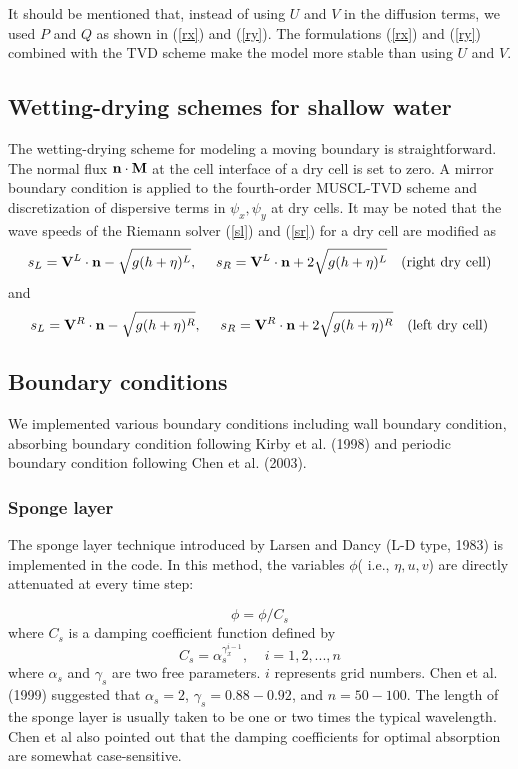 \documentclass[11pt]{article}
\newcommand{\be}{\begin{equation}}
\newcommand{\ee}{\end{equation}}
\begin{document}
It should be mentioned that, instead of using $U$ and $V$ in the diffusion terms, we used $P$ and $Q$ as shown in (\ref{rx}) and (\ref{ry}).   The formulations  (\ref{rx}) and (\ref{ry}) combined with the TVD scheme make the model more stable than  using $U$ and $V$. 

\subsection{Wetting-drying schemes for shallow water}

The wetting-drying scheme for modeling  a moving boundary is straightforward. The normal flux ${\bf n} \cdot {\bf M}$ at the cell interface of a dry cell is set to zero. A mirror boundary condition is applied to the fourth-order MUSCL-TVD scheme and discretization of  dispersive terms in ${\psi_x, \psi_y}$ at dry cells. It may be noted that the wave speeds of the Riemann solver  (\ref{sl}) and (\ref{sr}) for a dry cell are modified as 
\be
s_L= {\bf V}^L \cdot {\bf n} - \sqrt{g (h+\eta)^L} ,  \ \ \ \    s_R= {\bf V}^L \cdot {\bf n} +2  \sqrt{g (h+\eta)^L}  \  \  \  \mbox{(right dry cell)}
\ee
and
\be
s_L= {\bf V}^R \cdot {\bf n} - \sqrt{g (h+\eta)^R} ,  \ \ \ \    s_R= {\bf V}^R \cdot {\bf n} +2  \sqrt{g (h+\eta)^R}  \  \  \  \mbox{(left dry cell)}
\ee


\subsection{Boundary conditions}

We implemented various boundary conditions including wall boundary condition, absorbing boundary condition following Kirby et al. (1998) and periodic boundary condition following Chen et al. (2003).

\subsubsection{Sponge layer}

The sponge layer technique introduced by Larsen and Dancy (L-D type, 1983) is implemented in the code. In this method, the variables $\phi$( i.e., $\eta, u, v$) are directly attenuated at every time step:

\be
\phi = \phi /C_s
\ee
where $C_s$ is a damping coefficient function defined by
\be
C_s = \alpha_s^{\gamma_x^{i-1}}, \ \ \ \ \ i=1,2, ..., n
\ee
where $\alpha_s$ and $\gamma_s$ are two free parameters. $i$ represents grid numbers. Chen et al. (1999) suggested that $\alpha_s =2$, $\gamma_s = 0.88 - 0.92$, and $n=50 - 100$. The length of the sponge layer is usually taken to be one or two times the typical wavelength. Chen et al also pointed out that the damping coefficients for optimal absorption are somewhat case-sensitive. 
\end{document}
